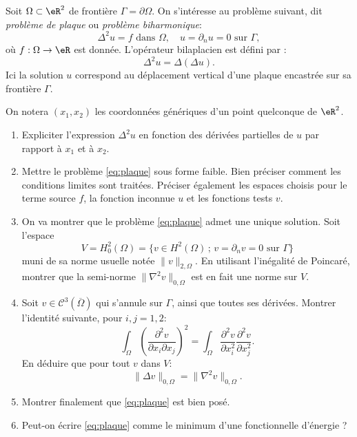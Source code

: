 \begin{exercice}\label{exoChWeak_plaque}

Soit $\Omega \subset \eR^2$ de frontière $\Gamma = \partial \Omega$.
On s'intéresse au problème suivant, dit \emph{problème de plaque} ou \emph{problème biharmonique}:
\begin{equation} \label{eq:plaque}
\Delta^2 u = f \mbox{ dans } \Omega, \quad u = \partial_n u = 0 \mbox{ sur } \Gamma,
\end{equation}
où $f : \Omega \rightarrow \eR$ est donnée. L'opérateur bilaplacien est défini par :
\[
\Delta^2 u = \Delta (\Delta u).
\]
Ici la solution $u$ correspond au déplacement vertical d'une plaque encastrée sur sa frontière $\Gamma$.

On notera $(x_1,x_2)$ les coordonnées génériques d'un point quelconque de $\eR^2$.

\begin{enumerate}

\item Expliciter l'expression $\Delta^2 u$ en fonction des dérivées partielles de $u$ par rapport à $x_1$ et à $x_2$.

\item Mettre le problème \eqref{eq:plaque} sous forme faible. Bien préciser comment les conditions limites sont traitées. Préciser également les espaces choisis pour le terme source $f$, la fonction inconnue $u$ et les fonctions tests $v$. 

\item 
On va montrer que le problème \eqref{eq:plaque} admet une unique solution. Soit l'espace
\[
V = H^2_0 (\Omega) = \{ v \in H^2(\Omega) \, ; \, v = \partial_n v = 0  \mbox{ sur } \Gamma \}
\]
muni de sa norme usuelle notée $\|v\|_{2,\Omega}$. En utilisant l'inégalité de Poincaré, montrer que la semi-norme $\| \nabla^2 v \|_{0,\Omega}$ est en fait une norme sur $V$.


\item Soit $v \in \mathcal{C}^3(\overline{\Omega})$ qui s'annule sur $\Gamma$, ainsi que toutes ses dérivées. Montrer l'identité suivante, pour $i,j=1,2$:
\[
\int_\Omega \left (\frac{\partial^2 v}{\partial x_i \partial x_j} \right )^2
=
\int_\Omega \frac{\partial^2 v}{\partial x_i^2} \frac{\partial^2 v}{\partial x_j^2}.
\]
En déduire que pour tout $v$ dans $V$:
\[
\| \Delta v \|_{0,\Omega} = \| \nabla^2 v \|_{0,\Omega}.
\]

\item Montrer finalement que \eqref{eq:plaque} est bien posé.

\item Peut-on écrire \eqref{eq:plaque} comme le minimum d'une fonctionnelle d'énergie ?

\end{enumerate}

\end{exercice}

